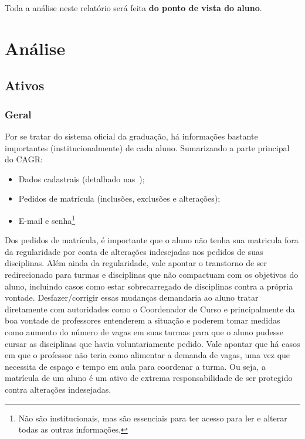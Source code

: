 \documentclass{article}
\begin{document}
    Toda a análise neste relatório será feita \textbf{do ponto de vista do
    aluno}.

    \section{Análise}

    \subsection{Ativos}

    \subsubsection{Geral}

    Por se tratar do sistema oficial da graduação, há informações bastante
    importantes (institucionalmente) de cada aluno. Sumarizando a parte
    principal do CAGR\@:

    \begin{itemize}
        \item Dados cadastrais (detalhado
            nas~);
        \item Pedidos de matrícula (inclusões, exclusões e alterações);
        \item E-mail e senha\footnote{Não são institucionais, mas são
            essenciais para ter acesso para ler e alterar todas as outras
            informações.}
    \end{itemize}

    Dos pedidos de matrícula, é importante que o aluno não tenha sua matricula
    fora da regularidade por conta de alterações indesejadas nos pedidos de
    suas disciplinas. Além ainda da regularidade, vale apontar o transtorno de
    ser redirecionado para turmas e disciplinas que não compactuam com os
    objetivos do aluno, incluindo casos como estar sobrecarregado de
    disciplinas contra a própria vontade. Desfazer/corrigir essas mudanças
    demandaria ao aluno tratar diretamente com autoridades como o Coordenador
    de Curso e principalmente da boa vontade de professores entenderem a
    situação e poderem tomar medidas como aumento do número de vagas em suas
    turmas para que o aluno pudesse cursar as disciplinas que havia
    voluntariamente pedido. Vale apontar que há casos em que o professor não
    teria como alimentar a demanda de vagas, uma vez que necessita de espaço e
    tempo em aula para coordenar a turma. Ou seja, a matrícula de um aluno é um
    ativo de extrema responsabilidade de ser protegido contra alterações
    indesejadas.
\end{document}

